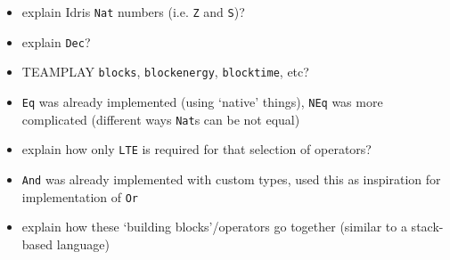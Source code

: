 \begin{itemize}
	\item explain Idris \texttt{Nat} numbers (i.e. \texttt{Z} and \texttt{S})?
	\item explain \texttt{Dec}?
	\item TEAMPLAY \texttt{blocks}, \texttt{blockenergy}, \texttt{blocktime},
		  etc?
	\item \texttt{Eq} was already implemented (using `native' things),
		  \texttt{NEq} was more complicated (different ways \texttt{Nat}s can be
		  not equal)
	\item explain how only \texttt{LTE} is required for that selection of
		  operators?
	\item \texttt{And} was already implemented with custom types, used this as
		  inspiration for implementation of \texttt{Or}
	\item explain how these `building blocks'/operators go together (similar to
		  a stack-based language)
\end{itemize}